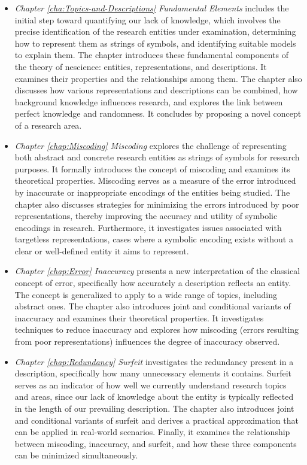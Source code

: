 \begin{itemize}

 \item \emph{Chapter \ref{cha:Topics-and-Descriptions} Fundamental Elements} includes the initial step toward quantifying our lack of knowledge, which involves the precise identification of the research entities under examination, determining how to represent them as strings of symbols, and identifying suitable models to explain them. The chapter introduces these fundamental components of the theory of nescience: entities, representations, and descriptions. It examines their properties and the relationships among them. The chapter also discusses how various representations and descriptions can be combined, how background knowledge influences research, and explores the link between perfect knowledge and randomness. It concludes by proposing a novel concept of a research area.

\item \emph{Chapter \ref{chap:Miscoding} Miscoding} explores the challenge of representing both abstract and concrete research entities as strings of symbols for research purposes. It formally introduces the concept of miscoding and examines its theoretical properties. Miscoding serves as a measure of the error introduced by inaccurate or inappropriate encodings of the entities being studied. The chapter also discusses strategies for minimizing the errors introduced by poor representations, thereby improving the accuracy and utility of symbolic encodings in research.  Furthermore, it investigates issues associated with targetless representations, cases where a symbolic encoding exists without a clear or well-defined entity it aims to represent.

\item \emph{Chapter \ref{chap:Error} Inaccuracy} presents a new interpretation of the classical concept of error, specifically how accurately a description reflects an entity. The concept is generalized to apply to a wide range of topics, including abstract ones. The chapter also introduces joint and conditional variants of inaccuracy and examines their theoretical properties. It investigates techniques to reduce inaccuracy and explores how miscoding (errors resulting from poor representations) influences the degree of inaccuracy observed.

\item \emph{Chapter \ref{chap:Redundancy} Surfeit} investigates the redundancy present in a description, specifically how many unnecessary elements it contains. Surfeit serves as an indicator of how well we currently understand research topics and areas, since our lack of knowledge about the entity is typically reflected in the length of our prevailing description. The chapter also introduces joint and conditional variants of surfeit and derives a practical approximation that can be applied in real-world scenarios. Finally, it examines the relationship between miscoding, inaccuracy, and surfeit, and how these three components can be minimized simultaneously.


\end{itemize}
